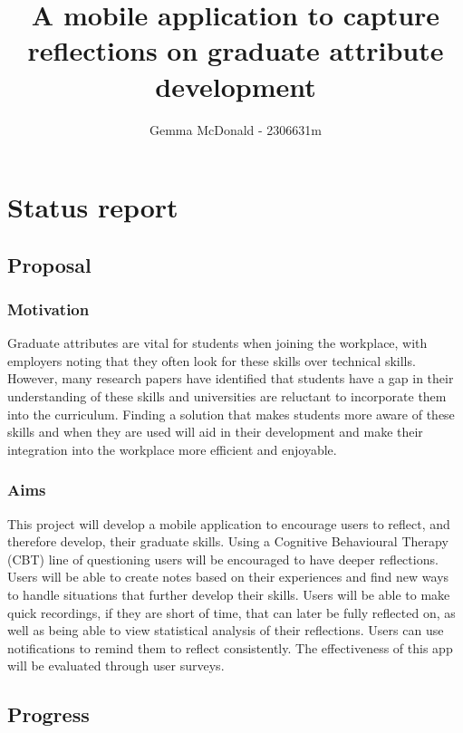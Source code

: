 \documentclass[11pt]{article}
\title{A mobile application to capture reflections on graduate attribute development}
\author{ {Gemma McDonald} - {2306631m} }
\begin{document}
    \maketitle
    
    
     

\section{Status report}

\subsection{Proposal}\label{proposal}

\subsubsection{Motivation}\label{motivation}

Graduate attributes are vital for students when joining the workplace, with employers noting that they often look for these skills over technical skills. However, many research papers have identified that students have a gap in their understanding of these skills and universities are reluctant to incorporate them into the curriculum. Finding a solution that makes students more aware of these skills and when they are used will aid in their development and make their integration into the workplace more efficient and enjoyable.

\subsubsection{Aims}\label{aims}

This project will develop a mobile application to encourage users to reflect, and therefore develop, their graduate skills. Using a Cognitive Behavioural Therapy (CBT) line of questioning users will be encouraged to have deeper reflections. Users will be able to create notes based on their experiences and find new ways to handle situations that further develop their skills. Users will be able to make quick recordings, if they are short of time, that can later be fully reflected on, as well as being able to view statistical analysis of their reflections. Users can use notifications to remind them to reflect consistently. The effectiveness of this app will be evaluated through user surveys.

\subsection{Progress}\label{progress}
\end{document}

